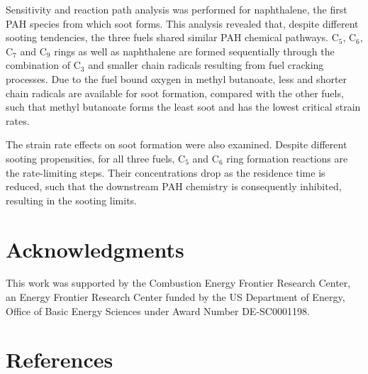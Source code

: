 \documentclass[review,3p,times]{elsarticleUS}
\begin{document}
Sensitivity and reaction path analysis was performed for naphthalene, the first PAH species from which soot forms. This analysis revealed that, despite different sooting tendencies, the three fuels shared similar PAH chemical pathways. C$_5$, C$_6$, C$_7$ and C$_9$ rings as well as naphthalene are formed sequentially through the combination of C$_3$ and smaller chain radicals resulting from fuel cracking processes. Due to the fuel bound oxygen in methyl butanoate, less and shorter chain radicals are available for soot formation, compared with the other fuels, such that methyl butanoate forms the least soot and has the lowest critical strain rates.

The strain rate effects on soot formation were also examined. Despite different sooting propensities, for all three fuels, C$_5$ and C$_6$ ring formation reactions are the rate-limiting steps. Their concentrations drop as the residence time is reduced, such that the downstream PAH chemistry is consequently inhibited, resulting in the sooting limits.


\section*{Acknowledgments}
This work was supported by the Combustion Energy Frontier Research Center, an Energy Frontier Research Center funded by the US Department of Energy, Office of Basic Energy Sciences under Award Number DE-SC0001198.

\section*{References}




\renewcommand{\thefigure}{\arabic{figure}}
\renewcommand{\thetable}{\arabic{table}}
\end{document}
